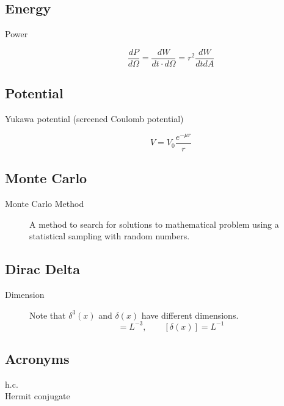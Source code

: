 \subsection{Energy}
\begin{description}
    \item [Power]
	\begin{equation}
	    \frac{dP}{d\Omega} = \frac{dW}{dt\cdot d\Omega} = r^2\frac{dW}{dt dA}
	\end{equation}
\end{description}

\subsection{Potential}
\begin{description}
    \item [Yukawa potential (screened Coulomb potential)]
	\begin{equation}
	    \label{eqn:Yukawa}
	    V = V_0\frac{e^{-\mu r}}{r}
	\end{equation}
\end{description}

\subsection{Monte Carlo}
\begin{description}
    \item [Monte Carlo Method]
	A method to search for solutions to mathematical problem using a statistical sampling with random numbers.
\end{description}

\subsection{Dirac Delta}
\begin{description}
    \item [Dimension] 
	Note that $\delta^3(x)$ and $\delta(x)$ have different dimensions.
	\begin{equation}
	    [\delta^3(x)] = L^{-3}, \qquad [\delta(x)] = L^{-1}
	\end{equation}
\end{description}

\subsection{Acronyms}
h.c.	\\
    Hermit conjugate	\\


